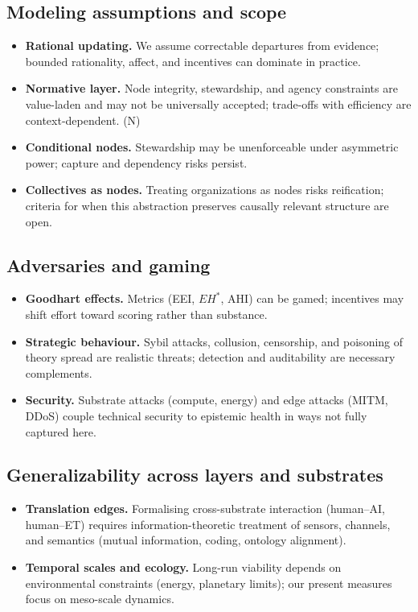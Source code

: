 \documentclass[12pt]{article}
\begin{document}
\subsection{Modeling assumptions and scope}
\begin{itemize}[leftmargin=1.2em]
\item \textbf{Rational updating.} We assume correctable departures from evidence; bounded rationality, affect, and incentives can dominate in practice.
\item \textbf{Normative layer.} Node integrity, stewardship, and agency constraints are value-laden and may not be universally accepted; trade-offs with efficiency are context-dependent. (N)
\item \textbf{Conditional nodes.} Stewardship may be unenforceable under asymmetric power; capture and dependency risks persist.
\item \textbf{Collectives as nodes.} Treating organizations as nodes risks reification; criteria for when this abstraction preserves causally relevant structure are open.
\end{itemize}

\subsection{Adversaries and gaming}
\begin{itemize}[leftmargin=1.2em]
\item \textbf{Goodhart effects.} Metrics (EEI, $EH^{\ast}$, AHI) can be gamed; incentives may shift effort toward scoring rather than substance.
\item \textbf{Strategic behaviour.} Sybil attacks, collusion, censorship, and poisoning of theory spread are realistic threats; detection and auditability are necessary complements.
\item \textbf{Security.} Substrate attacks (compute, energy) and edge attacks (MITM, DDoS) couple technical security to epistemic health in ways not fully captured here.
\end{itemize}

\subsection{Generalizability across layers and substrates}
\begin{itemize}[leftmargin=1.2em]
\item \textbf{Translation edges.} Formalising cross-substrate interaction (human--AI, human--ET) requires information-theoretic treatment of sensors, channels, and semantics (mutual information, coding, ontology alignment).
\item \textbf{Temporal scales and ecology.} Long-run viability depends on environmental constraints (energy, planetary limits); our present measures focus on meso-scale dynamics.
\end{itemize}
\end{document}
